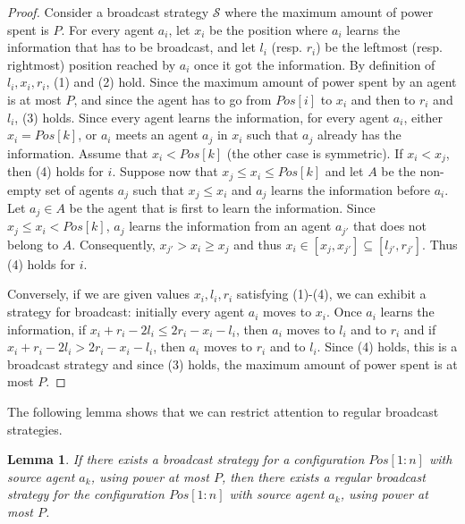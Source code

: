 \documentclass{article}
\newtheorem{lemma}{Lemma}
\newcommand\cS{\ensuremath{\mathcal{S}\xspace}}
\begin{document}
\begin{proof}
Consider a broadcast strategy $\cS$ where the maximum amount of power
spent is $P$.  For every agent $a_i$, let $x_i$ be the position where
$a_i$ learns the information that has to be broadcast, and let $l_i$
(resp. $r_i$) be the leftmost (resp. rightmost) position reached by
$a_i$ once it got the information.  By definition of $l_i, x_i, r_i$,
(1) and (2) hold. Since the maximum amount of power spent by an agent
is at most $P$, and since the agent has to go from $Pos[i]$ to $x_i$
and then to $r_i$ and $l_i$, (3) holds.  Since every agent learns the
information, for every agent $a_i$, either $x_i = Pos[k]$, or $a_i$ meets
an agent $a_j$ in $x_i$ such that $a_j$ already has the information.
Assume that $x_i < Pos[k]$ (the other case is symmetric). If $x_i <
x_j$, then (4) holds for $i$.  Suppose now that $x_j \leq x_i \leq
Pos[k]$ and let $A$ be the non-empty set of agents $a_j$ such that
$x_j \leq x_i$ and $a_j$ learns the information before $a_i$. Let $a_j
\in A$ be the agent that is first to learn the information. Since $x_j \leq
x_i < Pos[k]$, $a_j$ learns the information from an agent $a_{j'}$
that does not belong to $A$. Consequently, $x_{j'} > x_i \geq x_j$ and
thus $x_i \in [x_j,x_{j'}] \subseteq [l_{j'},r_{j'}]$. Thus (4) holds
for $i$. 

Conversely, if we are given values $x_i, l_i, r_i$ satisfying (1)-(4),
we can exhibit a strategy for broadcast: initially every agent
$a_i$ moves to $x_i$. Once $a_i$ learns the information, if
$x_i+r_i-2l_i \leq 2r_i-x_i-l_i$, then $a_i$ moves to $l_i$ and to
$r_i$ and if $x_i+r_i-2l_i > 2r_i-x_i-l_i$, then $a_i$ moves to $r_i$ and
to $l_i$. Since (4) holds, this is a broadcast strategy and since (3) holds, the maximum amount of power spent is at most $P$. 
\end{proof}

\medskip

The following lemma shows that we can restrict attention to regular broadcast strategies.

\begin{lemma}\label{lem-shape-algo-b}
If there exists a broadcast strategy for a configuration
$Pos[1:n]$ with source agent $a_k$, using power at most $P$, then there exists a regular broadcast strategy for the configuration
$Pos[1:n]$ with source agent $a_k$, using power at most $P$.
\end{lemma} 
\end{document}
